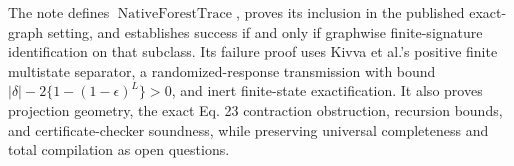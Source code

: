 The note defines \(\operatorname{NativeForestTrace}\), proves its inclusion in the published exact-graph setting, and establishes success if and only if graphwise finite-signature identification on that subclass. Its failure proof uses Kivva et al.'s positive finite multistate separator, a randomized-response transmission with bound \(|\delta|-2\{1-(1-\epsilon)^L\}>0\), and inert finite-state exactification. It also proves projection geometry, the exact Eq. 23 contraction obstruction, recursion bounds, and certificate-checker soundness, while preserving universal completeness and total compilation as open questions.